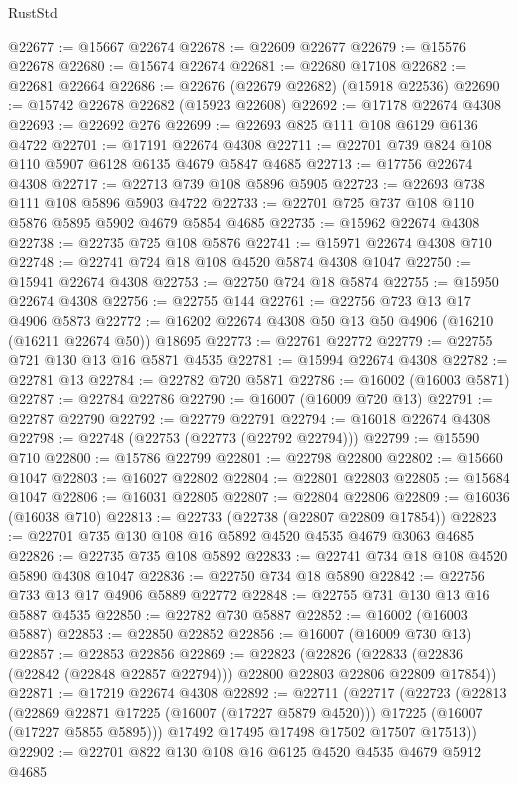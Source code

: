 \begin{lexlean}{RustStd}
\begin{coremodule}
@22677 := @15667 @22674
@22678 := @22609 @22677
@22679 := @15576 @22678
@22680 := @15674 @22674
@22681 := @22680 @17108
@22682 := @22681 @22664
@22686 := @22676 (@22679 @22682) (@15918 @22536)
@22690 := @15742 @22678 @22682 (@15923 @22608)
@22692 := @17178 @22674 @4308
@22693 := @22692 @276
@22699 := @22693 @825 @111 @108 @6129 @6136 @4722
@22701 := @17191 @22674 @4308
@22711 := @22701 @739 @824 @108 @110 @5907 @6128 @6135 @4679 @5847 @4685
@22713 := @17756 @22674 @4308
@22717 := @22713 @739 @108 @5896 @5905
@22723 := @22693 @738 @111 @108 @5896 @5903 @4722
@22733 := @22701 @725 @737 @108 @110 @5876 @5895 @5902 @4679 @5854 @4685
@22735 := @15962 @22674 @4308
@22738 := @22735 @725 @108 @5876
@22741 := @15971 @22674 @4308 @710
@22748 := @22741 @724 @18 @108 @4520 @5874 @4308 @1047
@22750 := @15941 @22674 @4308
@22753 := @22750 @724 @18 @5874
@22755 := @15950 @22674 @4308
@22756 := @22755 @144
@22761 := @22756 @723 @13 @17 @4906 @5873
@22772 := @16202 @22674 @4308 @50 @13 @50 @4906 (@16210 (@16211 @22674 @50)) @18695
@22773 := @22761 @22772
@22779 := @22755 @721 @130 @13 @16 @5871 @4535
@22781 := @15994 @22674 @4308
@22782 := @22781 @13
@22784 := @22782 @720 @5871
@22786 := @16002 (@16003 @5871)
@22787 := @22784 @22786
@22790 := @16007 (@16009 @720 @13)
@22791 := @22787 @22790
@22792 := @22779 @22791
@22794 := @16018 @22674 @4308
@22798 := @22748 (@22753 (@22773 (@22792 @22794)))
@22799 := @15590 @710
@22800 := @15786 @22799
@22801 := @22798 @22800
@22802 := @15660 @1047
@22803 := @16027 @22802
@22804 := @22801 @22803
@22805 := @15684 @1047
@22806 := @16031 @22805
@22807 := @22804 @22806
@22809 := @16036 (@16038 @710)
@22813 := @22733 (@22738 (@22807 @22809 @17854))
@22823 := @22701 @735 @130 @108 @16 @5892 @4520 @4535 @4679 @3063 @4685
@22826 := @22735 @735 @108 @5892
@22833 := @22741 @734 @18 @108 @4520 @5890 @4308 @1047
@22836 := @22750 @734 @18 @5890
@22842 := @22756 @733 @13 @17 @4906 @5889 @22772
@22848 := @22755 @731 @130 @13 @16 @5887 @4535
@22850 := @22782 @730 @5887
@22852 := @16002 (@16003 @5887)
@22853 := @22850 @22852
@22856 := @16007 (@16009 @730 @13)
@22857 := @22853 @22856
@22869 := @22823
    (@22826 (@22833 (@22836 (@22842 (@22848 @22857 @22794))) @22800 @22803 @22806 @22809 @17854))
@22871 := @17219 @22674 @4308
@22892 := @22711
    (@22717
      (@22723
        (@22813
          (@22869 @22871 @17225 (@16007 (@17227 @5879 @4520)))
          @17225
          (@16007 (@17227 @5855 @5895)))
        @17492
        @17495
        @17498
        @17502
        @17507
        @17513))
@22902 := @22701 @822 @130 @108 @16 @6125 @4520 @4535 @4679 @5912 @4685

\end{coremodule}
\end{lexlean}
